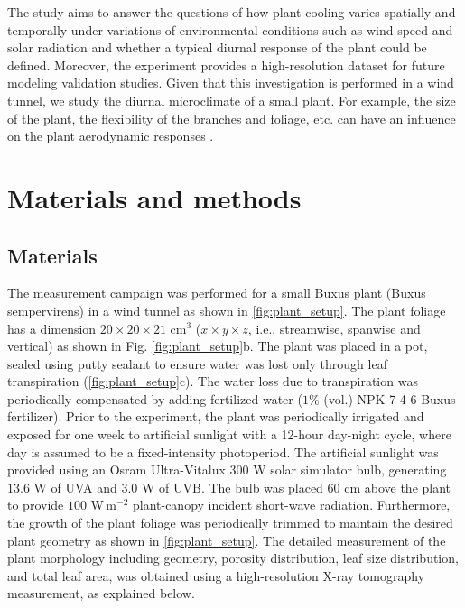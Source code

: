 The study aims to answer the questions of how plant cooling varies spatially and temporally under variations of environmental conditions such as wind speed and solar radiation and whether a typical diurnal response of the plant could be defined. Moreover, the experiment provides a high-resolution dataset for future modeling validation studies. Given that this investigation is performed in a wind tunnel, we study the diurnal microclimate of a small plant.  For example, the size of the plant, the flexibility of the branches and foliage, etc. can have an influence on the plant aerodynamic responses \citep{DeLangre2008,Manickathan2018b}. 

\section{Materials and methods}

\subsection{Materials}


The measurement campaign was performed for a small Buxus plant (Buxus sempervirens) in a wind tunnel as shown in \cref{fig:plant_setup}. The plant foliage has a dimension $20\times20\times21$ cm$^3$ ($x\times y\times z$, i.e., streamwise, spanwise and vertical) as shown in Fig. \cref{fig:plant_setup}b. The plant was placed in a pot, sealed using putty sealant to ensure water was lost only through leaf transpiration (\cref{fig:plant_setup}c). The water loss due to transpiration was periodically compensated by adding fertilized water ($1$\% (vol.) NPK 7-4-6 Buxus fertilizer). Prior to the experiment, the plant was periodically irrigated and exposed for one week to artificial sunlight with a 12-hour day-night cycle, where day is assumed to be a fixed-intensity photoperiod. The artificial sunlight was provided using an Osram Ultra-Vitalux $300$ W solar simulator bulb, generating $13.6$ W of UVA and $3.0$ W of UVB. The bulb was placed 60 cm above the plant to provide $100$ W\,m$^{-2}$ plant-canopy incident short-wave radiation. Furthermore, the growth of the plant foliage was periodically trimmed to maintain the desired plant geometry as shown in \cref{fig:plant_setup}. The detailed measurement of the plant morphology including geometry, porosity distribution, leaf size distribution, and total leaf area, was obtained using a high-resolution X-ray tomography measurement, as explained below. 


